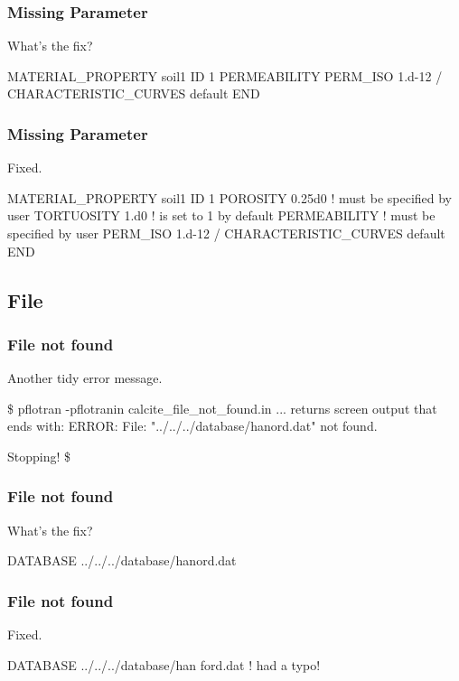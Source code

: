 \documentclass{beamer}
\newcommand\gehcomment[1]{{{\color{orange} #1}}}
\newcommand\redcomment[1]{{{\color{red} #1}}}
\newcommand\bluecomment[1]{{{\color{blue} #1}}}
\begin{document}
\begin{frame}\frametitle{Missing Parameter}
\redcomment{What's the fix?}
\begin{semiverbatim}

MATERIAL_PROPERTY soil1
  ID 1
  PERMEABILITY
    PERM_ISO 1.d-12
  /
  CHARACTERISTIC_CURVES default
END
\end{semiverbatim}

\end{frame}

\begin{frame}\frametitle{Missing Parameter}
\redcomment{Fixed.}
\begin{semiverbatim}

MATERIAL_PROPERTY soil1
  ID 1
  POROSITY 0.25d0 \bluecomment{! must be specified by user}
  TORTUOSITY 1.d0 \bluecomment{! is set to 1 by default}
  PERMEABILITY    \bluecomment{! must be specified by user}
    PERM_ISO 1.d-12
  /
  CHARACTERISTIC_CURVES default
END
\end{semiverbatim}

\end{frame}

\subsection{File}
\begin{frame}\frametitle{File not found}
Another tidy error message.
\begin{semiverbatim}

\$ pflotran -pflotranin calcite_file_not_found.in
... \gehcomment{returns screen output that ends with:}
  ERROR: File: "../../../database/hanord.dat" not found.

  Stopping!
\$
\end{semiverbatim}

\end{frame}

\begin{frame}\frametitle{File not found}
\redcomment{What's the fix?}
\begin{semiverbatim}
DATABASE ../../../database/hanord.dat
\end{semiverbatim}

\end{frame}

\begin{frame}\frametitle{File not found}
\redcomment{Fixed.}
\begin{semiverbatim}
DATABASE ../../../database/han\redcomment{f}ord.dat \bluecomment{! had a typo!}
\end{semiverbatim}

\end{frame}
\end{document}
